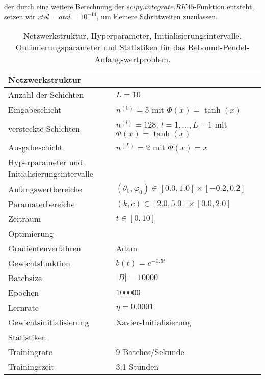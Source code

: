 der durch eine weitere Berechnung der $scipy.integrate.RK45$-Funktion entsteht, setzen wir $rtol=atol=10^{-14}$, um
kleinere Schrittweiten zuzulassen.
\begin{table}
       \renewcommand{\arraystretch}{1.0}
       \centering
       \begin{tabular}{ l | l }
              \hline
              Netzwerkstruktur & \\
              \hline
              Anzahl der Schichten & $L=10$ \\
              Eingabeschicht & $n^{(0)}=5$ mit $\Phi(x)=\tanh(x)$ \\
              versteckte Schichten & $n^{(l)}=128$, $l = 1, \dots, L-1$ mit $\Phi(x)=\tanh(x)$ \\
              Ausgabeschicht & $n^{(L)}=2$ mit $\Phi(x)=x$ \\
              \hline
              Hyperparameter und Initialisierungsintervalle & \\
              \hline
              Anfangswertbereiche & $(\theta_0, \varphi_0) \in [0.0, 1.0] \times [-0.2, 0.2]$ \\
              Paramaterbereiche & $(k, c) \in [2.0, 5.0] \times [0.0, 2.0]$ \\
              Zeitraum & $t \in [0, 10]$ \\
              \hline
              Optimierung & \\
              \hline
              Gradientenverfahren & Adam \\
              Gewichtsfunktion & $b(t)=e^{-0.5t}$ \\
              Batchsize & $|B|=10000$ \\
              Epochen & $100000$ \\
              Lernrate & $\eta= 0.0001$ \\
              Gewichtsinitialisierung & Xavier-Initialisierung \\
              \hline
              Statistiken & \\
              \hline
              Trainingrate & 9 Batches/Sekunde  \\
              Trainingszeit & 3.1 Stunden \\
              \hline
       \end{tabular}
       \caption{Netzwerkstruktur, Hyperparameter, Initialisierungsintervalle, Optimierungsparameter und Statistiken
       für das Rebound-Pendel-Anfangswertproblem.}
\label{rebound-pendulum-table}
\end{table}
